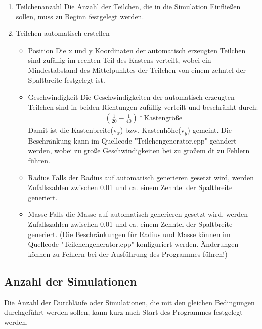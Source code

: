 \documentclass[14pt,a4paper]{scrartcl}
\begin{document}
\begin{enumerate}

\item Teilchenanzahl
\newline
Die Anzahl der Teilchen, die in die Simulation Einfließen sollen, muss zu Beginn festgelegt werden.

\item Teilchen automatisch erstellen

\begin{itemize}

\item Position
\newline
Die x und y Koordinaten der automatisch erzeugten Teilchen sind zufällig im rechten Teil des Kastens verteilt, wobei ein Mindestabstand des Mittelpunktes der Teilchen von einem zehntel der Spaltbreite festgelegt ist.

\item Geschwindigkeit
\newline
Die Geschwindigkeiten der automatisch erzeugten Teilchen sind in beiden Richtungen zufällig verteilt und beschränkt durch:
\begin{align*}
(\frac{1}{20}-\frac{1}{40})*\text{Kastengröße}
\end{align*}
Damit ist die Kastenbreite(v$_x$) bzw. Kastenhöhe(v$_y$)
gemeint. Die Beschränkung kann im Quellcode "Teilchengenerator.cpp" geändert werden, wobei zu große Geschwindigkeiten bei zu großem dt zu Fehlern führen.
\item Radius
\newline
Falls der Radius auf automatisch generieren gesetzt wird, werden Zufallszahlen zwischen 0.01 und ca. einem Zehntel der Spaltbreite generiert.
\item Masse
\newline
Falls die Masse auf automatisch generieren gesetzt wird,
werden Zufallszahlen zwischen 0.01 und ca. einem Zehntel der Spaltbreite generiert. (Die Beschränkungen für Radius und Masse können im Quellcode "Teilchengenerator.cpp" konfiguriert werden.  Änderungen können zu Fehlern bei der Ausführung des Programmes führen!) 

\end{itemize}
\end{enumerate}
\subsection{Anzahl der Simulationen}
Die Anzahl der Durchläufe oder Simulationen, die mit den gleichen Bedingungen durchgeführt werden sollen, kann kurz nach Start des Programmes festgelegt werden.
\end{document}
